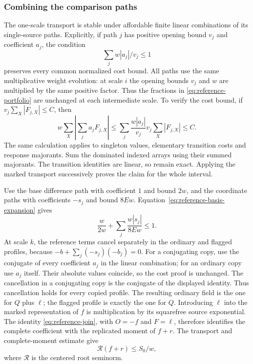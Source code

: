 \subsubsection{Combining the comparison paths}
The one-scale transport is stable under affordable finite linear
combinations of its single-source paths. Explicitly, if path
$j$ has positive opening bound $v_j$ and coefficient $a_j$,
the condition
\begin{equation}\label{eq:reference-portfolio}
                           \sum_j w|a_j|/v_j\le1
\end{equation}
preserves every common normalized cost bound. All paths use the
same multiplicative weight evolution: at scale $i$ the opening
bounds $v_j$ and $w$ are multiplied by the same positive factor.
Thus the fractions in \eqref{eq:reference-portfolio} are unchanged
at each intermediate scale. To verify the cost bound,
if $v_j\sum_X|F_{j,X}|\le C$, then
\[
 w\sum_X\left|\sum_ja_jF_{j,X}\right|
       \le\sum_j\frac{w|a_j|}{v_j}
                          v_j\sum_X|F_{j,X}|\le C.
\]
The same calculation applies to singleton values, elementary
transition costs and response majorants. Sum the dominated
indexed arrays using their summed majorants. The transition
identities are linear, so remain exact. Applying the marked
transport successively proves the claim for the whole interval.

Use the base difference path with coefficient $1$ and bound
$2w$, and the coordinate paths with coefficients $-s_j$ and
bound $8Ew$. Equation~\eqref{eq:reference-basis-expansion} gives
\[
                 \frac{w}{2w}
                     +\sum_j\frac{w|s_j|}{8Ew}\le1.
\]
At scale $k$, the reference terms cancel separately in the
ordinary and flagged profiles, because
$-b+\sum_j(-s_j)(-b_j)=0$.
For a conjugating copy, use the conjugate of every coefficient
$a_j$ in the linear combination; for an ordinary copy use $a_j$ itself.
Their absolute values coincide, so the cost proof is unchanged.
The cancellation in a conjugating copy is the conjugate of the
displayed identity. Thus cancellation holds for every copied profile.
The resulting ordinary field is the one for $Q$ plus $\ell$;
the flagged profile is exactly the one for $Q$. Introducing
$\ell$ into the marked representation of $f$ is multiplication
by its squarefree source exponential. The identity
\eqref{eq:reference-join}, with $O=-f$ and $F=\ell$, therefore
identifies the complete coefficient with the replicated moment
of $f+r$. The transport and complete-moment estimate give
\[
                           \mathcal R(f+r)\le S_0/w,
\]
where $\mathcal R$ is the centered root seminorm.


